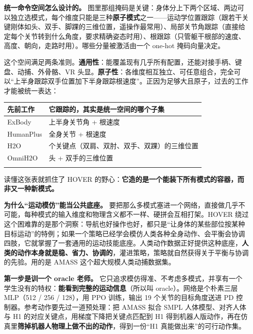 \documentclass[
  chinese,
]{ctexart}
\begin{document}
\textbf{统一命令空间怎么设计的。}
图里那组掩码是关键：身体分上下两个区域、两边可以独立选模式，每个维度只能是三种\textbf{原子模式}之一------运动学位置跟踪（跟若干关键刚体如头、双手、脚踝的三维位置，遥操作最常用）、局部关节角跟踪（直接给定每个关节转到什么角度，要求精确姿态时用）、根跟踪（只管躯干根部的速度、高度、朝向，走路时用）。哪些分量被激活由一个
one-hot 掩码向量决定。

这个空间满足两条准则。\textbf{通用性}：能覆盖现有几乎所有配置，还能对接手柄、键盘、动捕、外骨骼、VR
头显。\textbf{原子性}：各维度相互独立、可任意组合，完全可以``上半身跟踪双手位置加下半身跟踪根速度''。正因为足够大且原子，过去的工作才能被统一表达：

\begin{center}
\begin{tabular}{@{}>{\raggedright\arraybackslash}p{} >{\raggedright\arraybackslash}p{}@{}}
\toprule\noalign{}
先前工作 & 它跟踪的，其实是统一空间的哪个子集 \\
\midrule\noalign{}
ExBody & 上半身关节角 + 根速度 \\
HumanPlus & 全身关节 + 根速度 \\
H2O & 8 个关键点（双肩、双肘、双手、双踝）的三维位置 \\
OmniH2O & 头 + 双手的三维位置 \\
\bottomrule\noalign{}
\end{tabular}
\end{center}

读懂这张表就抓住了 HOVER
的野心：\textbf{它造的是一个能装下所有模式的容器，而非又一种新模式。}

\textbf{为什么``运动模仿''能当公共底座。}
要把那么多模式塞进一个网络，直接做几乎不可能，每种模式的输入维度和物理含义都不一样、硬拼会互相打架。HOVER
绕过这个困难靠的是那个洞察：导航也好操作也好，都只是``让身体的某些部位按某种目标运动''的特例；如果一个策略已经学会模仿人类各种全身动作、会平衡会协调四肢，它就掌握了一套通用的运动技能底座。人类动作数据正好提供这种底座，\textbf{人类的动作本身就是稳、省力、协调的}，灌进策略，策略就自然获得关于平衡与协调的先验。用的是
AMASS 这个超大规模人类动捕数据集。

\textbf{第一步是训一个 oracle 老师。}
它只追求模仿得准、不考虑多模式，并享有一个学生没有的特权：\textbf{能看到完整的运动信息}（所以叫
oracle）。网络是个朴素三层 MLP（512 / 256 / 128），用 PPO 训练，输出 19
个关节的目标角度送进 PD 控制器。参考动作要先过一道预处理：把 AMASS 拟合
SMPL 人体模型、对齐人体与 H1 的对应关键点，用梯度下降把关键点匹配到 H1
得到机器人版动作，再在仿真里\textbf{筛掉机器人物理上做不出的动作}，得到一份``H1
真能做出来''的可行动作集。
\end{document}
